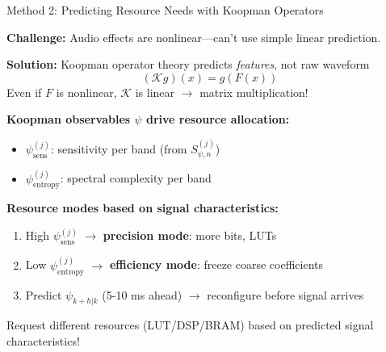 \documentclass[aspectratio=169,11pt]{beamer}
\begin{document}
\begin{frame}{Method 2: Predicting Resource Needs with Koopman Operators}

\textbf{Challenge:} Audio effects are nonlinear—can't use simple linear prediction.

\vspace{0.25cm}

\textbf{Solution:} Koopman operator theory predicts \emph{features}, not raw waveform
\[
(\mathcal{K} g)(x) = g(F(x))
\]
Even if $F$ is nonlinear, $\mathcal{K}$ is linear $\rightarrow$ matrix multiplication!

\vspace{0.25cm}

\textbf{Koopman observables $\psi$ drive resource allocation:}
\begin{itemize}
    \item $\psi_{\text{sens}}^{(j)}$: sensitivity per band (from $S_{\psi,n}^{(j)}$)
    \item $\psi_{\text{entropy}}^{(j)}$: spectral complexity per band
\end{itemize}

\vspace{0.25cm}

\textbf{Resource modes based on signal characteristics:}
\begin{enumerate}
    \item High $\psi_{\text{sens}}^{(j)}$ $\rightarrow$ \textbf{precision mode}: more bits, LUTs
    \item Low $\psi_{\text{entropy}}^{(j)}$ $\rightarrow$ \textbf{efficiency mode}: freeze coarse coefficients
    \item Predict $\psi_{k+h|k}$ (5-10 ms ahead) $\rightarrow$ reconfigure before signal arrives
\end{enumerate}

\end{frame}

\begin{frame}{}

\vspace{1.5cm}

\begin{tcolorbox}[colback=lightblue!10,colframe=lightblue!70,title=\textbf{Key Point}]
{\Large
Request different resources (LUT/DSP/BRAM) based on predicted signal characteristics!
}
\end{tcolorbox}

\end{frame}
\end{document}
